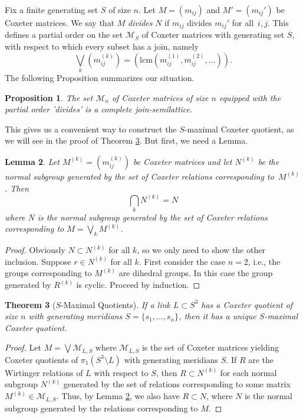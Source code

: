 \documentclass[11pt]{article}
\newtheorem{theorem}{Theorem}[section]
\newtheorem{proposition}[theorem]{Proposition}
\newtheorem{lemma}[theorem]{Lemma}
\theoremstyle{definition}
\begin{document}
Fix a finite generating set $S$ of size $n$. Let $M = (m_{ij})$ and $M' = (m_{ij}')$ be Coxeter matrices. We say that $M$ \textit{divides} $N$ if $m_{ij}$ divides $m_{ij}'$ for all~$i,j$. This defines a partial order on the set $\mathcal{M}_S$ of Coxeter matrices with generating set $S$, with respect to which every subset has a join, namely
$$\bigvee_{k} (m_{ij}^{(k)}) = \left( \text{lcm}(m_{ij}^{(1)}, m_{ij}^{(2)}, \dots) \right).$$
The following Proposition summarizes our situation.

\begin{proposition}
The set $\mathcal{M}_n$ of Coxeter matrices of size $n$ equipped with the partial order 'divides' is a complete join-semilattice.
\end{proposition}

This gives us a convenient way to construct the $S$-maximal Coxeter quotient, as we will see in the proof of Theorem \ref{thm:general-s-maximal-quotients}. But first, we need a Lemma.

\begin{lemma}\label{lem:intersection-normal-subgroups}
Let $M^{(k)} = (m_{ij}^{(k)})$ be Coxeter matrices and let $N^{(k)}$ be the normal subgroup generated by the set of Coxeter relations corresponding to~$M^{(k)}$. Then
$$\bigcap_k N^{(k)} = N$$
where $N$ is the normal subgroup generated by the set of Coxeter relations corresponding to $M = \bigvee_k M^{(k)}$.
\end{lemma}

\begin{proof}
Obviously $N \subset N^{(k)}$ for all $k$, so we only need to show the other inclusion. Suppose $r \in N^{(k)}$ for all $k$. First consider the case $n = 2$, i.e., the groups corresponding to $M^{(k)}$ are dihedral groups. In this case the group generated by $R^{(k)}$ is cyclic. Proceed by induction.
\end{proof}

\begin{theorem}[$S$-Maximal Quotients]\label{thm:general-s-maximal-quotients}
If a link $L \subset S^3$ has a Coxeter quotient of size $n$ with generating meridians $S = \{s_1, \dots, s_n\}$, then it has a unique $S$-maximal Coxeter quotient.
\end{theorem}

\begin{proof}
Let $M = \bigvee \mathcal{M}_{L,S}$ where $\mathcal{M}_{L,S}$ is the set of Coxeter matrices yielding Coxeter quotients of $\pi_1(S^3 \setminus L)$ with generating meridians $S$. If $R$ are the Wirtinger relations of $L$ with respect to $S$, then $R \subset N^{(k)}$ for each normal subgroup $N^{(k)}$ generated by the set of relations corresponding to some matrix $M^{(k)} \in \mathcal{M}_{L,S}$. Thus, by Lemma \ref{lem:intersection-normal-subgroups}, we also have $R \subset N$, where $N$ is the normal subgroup generated by the relations corresponding to $M$.
\end{proof}
\end{document}
